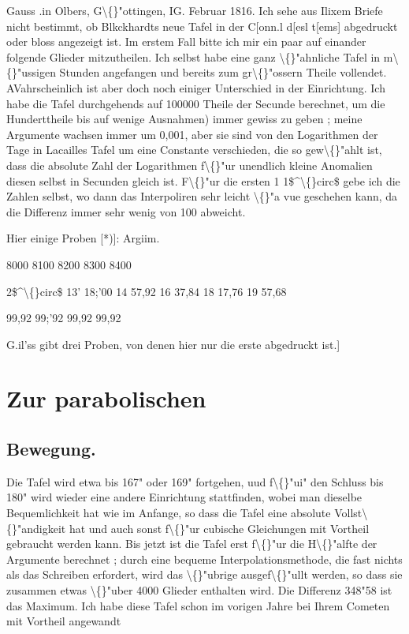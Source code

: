 \documentclass[10pt,a4paper]{article}
\begin{document}
Gauss .in Olbers, G\textbackslash\{\}"ottingen, IG. Februar 1816.
Ich sehe aus Ilixem Briefe nicht bestimmt, ob Blkckhardts neue
Tafel in der C[onn.l d[esl t[ems] abgedruckt oder bloss angezeigt ist. Im erstem
Fall bitte ich mir ein paar auf einander folgende Glieder mitzutheilen. Ich
selbst habe eine ganz \textbackslash\{\}"ahnliche Tafel in m\textbackslash\{\}"ussigen Stunden angefangen und
bereits zum gr\textbackslash\{\}"ossern Theile vollendet. AVahrscheinlich ist aber doch noch
einiger Unterschied in der Einrichtung. Ich habe die Tafel durchgehends
auf 100000 Theile der Secunde berechnet, um die Hunderttheile bis auf
wenige Ausnahmen) immer gewiss zu geben ; meine Argumente wachsen immer
um 0,001, aber sie sind von den Logarithmen der Tage in Lacailles Tafel
um eine Constante verschieden, die so gew\textbackslash\{\}"ahlt ist, dass die absolute Zahl der
Logarithmen f\textbackslash\{\}"ur unendlich kleine Anomalien diesen selbst in Secunden gleich
ist. F\textbackslash\{\}"ur die ersten 1 1\$\textasciicircum{}\textbackslash\{\}circ\$ gebe ich die Zahlen selbst, wo dann das Interpoliren
sehr leicht \textbackslash\{\}"a vue geschehen kann, da die Differenz immer sehr wenig von
100 abweicht.

Hier einige Proben [*)]:
Argiim.

8000
8100
8200
8300
8400

2\$\textasciicircum{}\textbackslash\{\}circ\$ 13' 18;'00
14 57,92
16 37,84
18 17,76
19 57,68

99,92
99;'92
99,92
99,92

G.il'ss gibt drei Proben, von denen hier nur die erste abgedruckt ist.]

\newpage
\section*{Zur parabolischen}

\subsection*{Bewegung.}


Die Tafel wird etwa bis 167" oder 169" fortgehen, uud f\textbackslash\{\}"ui" den
Schluss bis 180" wird wieder eine andere Einrichtung stattfinden, wobei man
dieselbe Bequemlichkeit hat wie im Anfange, so dass die Tafel eine absolute
Vollst\textbackslash\{\}"andigkeit hat und auch sonst f\textbackslash\{\}"ur cubische Gleichungen mit Vortheil
gebraucht werden kann. Bis jetzt ist die Tafel erst f\textbackslash\{\}"ur die H\textbackslash\{\}"alfte der Argumente berechnet ; durch eine bequeme Interpolationsmethode, die fast nichts
als das Schreiben erfordert, wird das \textbackslash\{\}"ubrige ausgef\textbackslash\{\}"ullt werden, so dass sie
zusammen etwas \textbackslash\{\}"uber 4000 Glieder enthalten wird. Die Differenz 348"58 ist
das Maximum. Ich habe diese Tafel schon im vorigen Jahre bei Ihrem Cometen mit Vortheil angewandt
\end{document}
